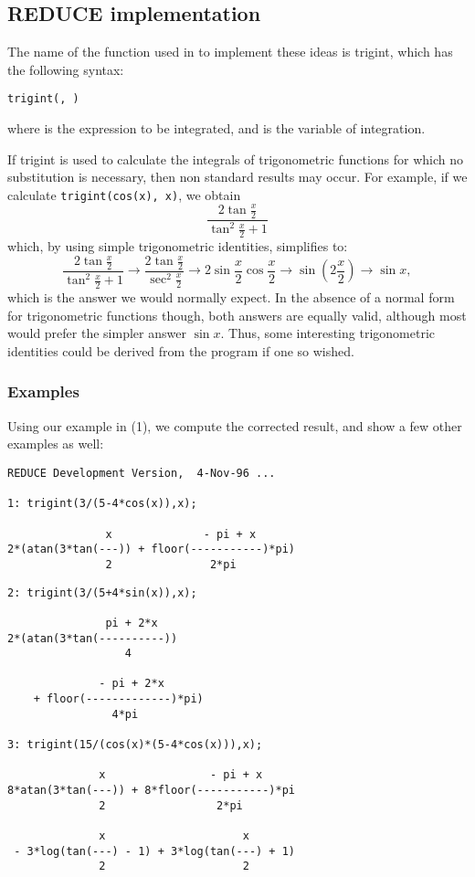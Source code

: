 \subsection{REDUCE implementation}
\hypertarget{operator:TRIGINT}{}
The name of the function used in \REDUCE to implement these ideas is trigint, which has the following syntax:
\begin{syntax}
  \texttt{trigint(, )}
\end{syntax}
where  is the expression to be integrated, and  is the variable of integration.

If trigint is used to calculate the integrals of trigonometric functions for which no substitution is necessary, then non standard results may occur. For example, if we calculate
\texttt{trigint(cos(x), x)},
we obtain
\[ \frac{2\tan\frac{x}{2}}{\tan^{2}\frac{x}{2}+1} \]
which, by using simple trigonometric identities, simplifies to:
\[ \frac{2\tan\frac{x}{2}}{\tan^{2}\frac{x}{2}+1} \rightarrow \frac{2\tan\frac{x}{2}}{\sec^{2}\frac{x}{2}} \rightarrow 2\sin\frac{x}{2}\cos\frac{x}{2} \rightarrow \sin \left(2\frac{x}{2}\right) \rightarrow \sin x, \]
which is the answer we would normally expect. In the absence of a
normal form for trigonometric functions though, both answers are
equally valid, although most would prefer the simpler answer $\sin
x$. Thus, some interesting trigonometric identities could be derived
from the program if one so wished.

\subsubsection{Examples}
Using our example in (1), we compute the corrected result, and show a few other examples as well:
\begin{verbatim}
REDUCE Development Version,  4-Nov-96 ...

1: trigint(3/(5-4*cos(x)),x);

               x              - pi + x
2*(atan(3*tan(---)) + floor(-----------)*pi)
               2               2*pi
\end{verbatim}

\begin{verbatim}
2: trigint(3/(5+4*sin(x)),x);

               pi + 2*x
2*(atan(3*tan(----------))
                  4

              - pi + 2*x
    + floor(-------------)*pi)
                4*pi

3: trigint(15/(cos(x)*(5-4*cos(x))),x);

              x                - pi + x
8*atan(3*tan(---)) + 8*floor(-----------)*pi
              2                 2*pi

              x                     x
 - 3*log(tan(---) - 1) + 3*log(tan(---) + 1)
              2                     2
\end{verbatim}
